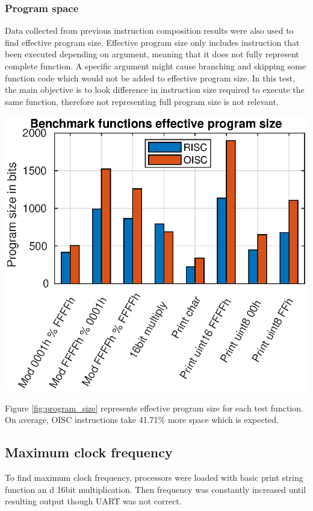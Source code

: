 \subsubsection{Program space}

Data collected from previous instruction composition results were also used to find effective program size.
Effective program size only includes instruction that been executed depending on argument, meaning that it does not fully represent complete function. A specific argument might cause branching and skipping some function code which would not be added to effective program size. In this test, the main objective is to look difference in instruction size required to execute the same function, therefore not representing full program size is not relevant. 
\begin{colfigure}
	\centering
	\includegraphics[width=\linewidth]{../tests/program_size.eps}
	\label{fig:program_size}
\end{colfigure}

Figure \ref{fig:program_size} represents effective program size for each test function. On average, OISC instructions take 41.71\% more space which is expected.

\subsection{Maximum clock frequency}
To find maximum clock frequency, processors were loaded with basic print string function an d 16bit multiplication. Then frequency was constantly increased until resulting output though UART was not correct. 

